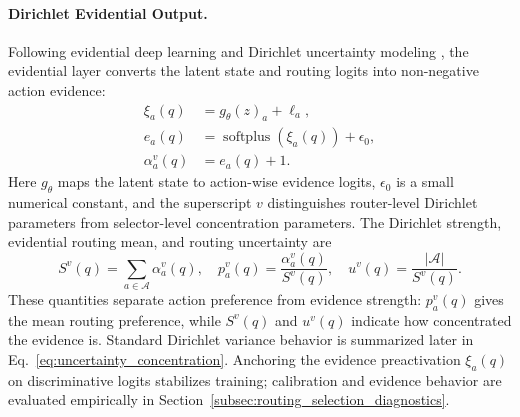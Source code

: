\documentclass[a4paper,fleqn]{cas-dc}
\begin{document}
\paragraph{Dirichlet Evidential Output.}
Following evidential deep learning and Dirichlet uncertainty modeling \citep{Sensoy2018Evidential,Malinin2018PriorNetworks}, the evidential layer converts the latent state and routing logits into non-negative action evidence:
\begin{equation}
\label{eq:vib_evidence_output}
\begin{aligned}
\xi_a(q)&=g_{\theta}(z)_a+\ell_a,\\
e_a(q)&=\operatorname{softplus}(\xi_a(q))+\epsilon_0,\\
\alpha_a^v(q)&=e_a(q)+1.
\end{aligned}
\end{equation}
Here $g_{\theta}$ maps the latent state to action-wise evidence logits, $\epsilon_0$ is a small numerical constant, and the superscript $v$ distinguishes router-level Dirichlet parameters from selector-level concentration parameters. The Dirichlet strength, evidential routing mean, and routing uncertainty are
\begin{equation}
\label{eq:evidential_strength_mean_uncertainty}
S^v(q)=\sum_{a\in\mathcal{A}}\alpha_a^v(q),\quad
p_a^v(q)=\frac{\alpha_a^v(q)}{S^v(q)},\quad
u^v(q)=\frac{|\mathcal{A}|}{S^v(q)}.
\end{equation}
These quantities separate action preference from evidence strength: $p_a^v(q)$ gives the mean routing preference, while $S^v(q)$ and $u^v(q)$ indicate how concentrated the evidence is. Standard Dirichlet variance behavior is summarized later in Eq.~\eqref{eq:uncertainty_concentration}. Anchoring the evidence preactivation $\xi_a(q)$ on discriminative logits stabilizes training; calibration and evidence behavior are evaluated empirically in Section~\ref{subsec:routing_selection_diagnostics}.
\end{document}

